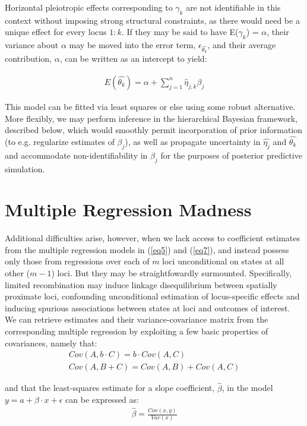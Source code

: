 \documentclass[12pt]{article}
\begin{document}
Horizontal pleiotropic effects corresponding to $\gamma_{k}$ are not identifiable in this context without imposing strong structural constraints, as there would need be a unique effect for every locus $1:k$. If they may be said to have E($\gamma_{k}$) = $\alpha$, their variance about $\alpha$ may be moved into the error term, $\epsilon_{\hat{\theta_{k}}}$, and their average contribution, $\alpha$, can be written as an intercept to yield: 

\begin{align}
E(\hat{\theta_{k}}) = \alpha + \sum_{j=1}^{n}\hat{\eta}_{j,k}\beta_j \label{eq15}
\end{align}

This model can be fitted via least squares or else using some robust alternative. More flexibly, we may perform inference in the hierarchical Bayesian framework, described below, which would smoothly permit incorporation of prior information (to e.g. regularize estimates of $\beta_j$), as well as propagate uncertainty in $\hat{\eta_j}$ and $\hat{\theta_k}$ and accommodate non-identifiability in $\beta_j$ for the purposes of posterior predictive simulation.\\

\section{Multiple Regression Madness}\label{sectionMultipleRegression}
Additional difficulties arise, however, when we lack access to coefficient estimates from the multiple regression models in (\ref{eq5}) and (\ref{eq7}), and instead possess only those from regressions over each of $m$ loci unconditional on states at all other ($m-1$) loci. But they may be straightfowardly surmounted. Specifically, limited recombination may induce linkage disequilibrium between spatially proximate loci, confounding unconditional estimation of locus-specific effects and inducing spurious associations between states at loci and outcomes of interest. We can retrieve estimates and their variance-covariance matrix from the corresponding multiple regression by exploiting a few basic properties of covariances, namely that:
\begin{align}
Cov(A, b\cdot C) = b\cdot Cov(A, C) \label{eq16}\\
Cov(A, B + C) = Cov(A, B) + Cov(A, C) \label{eq17}
\end{align}

and that the least-squares estimate for a slope coefficient, $\hat{\beta}$, in the model $y = a + \beta\cdot x + \epsilon$ can be expressed as:
\begin{align}
\hat{\beta} = \frac{Cov(x, y)}{Var(x)} \label{eq18}
\end{align}
\end{document}
